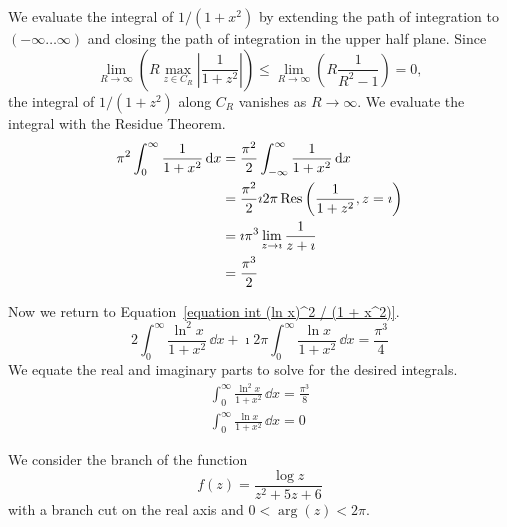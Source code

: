 {\begin{Solution}
  We evaluate the integral of $1/(1 + x^2)$ by extending the path of integration
  to $(-\infty \ldots \infty)$ and closing the path of integration in the upper half plane.
  Since 
  \[
  \lim_{R \to \infty} \left( R \max_{z \in C_R} \left| \frac{1}{1 + z^2} \right| \right)
  \leq \lim_{R \to \infty} \left( R \frac{1}{R^2 - 1} \right) = 0,
  \]
  the integral of $1 / (1 + z^2)$ along $C_R$ vanishes as $R \to \infty$.  We evaluate 
  the integral with the Residue Theorem.
  \begin{align*}
    \pi^2 \int_0^\infty \frac{1}{1 + x^2}\,\mathrm{d} x 
    &= \frac{\pi^2}{2} \int_{-\infty}^\infty \frac{1}{1 + x^2}\,\mathrm{d} x
    \\
    &= \frac{\pi^2}{2} \imath 2 \pi \mathop{\mathrm{Res}}\nolimits \left( \frac{1}{1 + z^2}, z = \imath \right) 
    \\
    &= \imath \pi^3 \lim_{z \to \imath} \frac{1}{z + \imath} 
    \\
    &= \frac{\pi^3}{2}
  \end{align*}

  Now we return to Equation~\ref{equation int (ln x)^2 / (1 + x^2)}.
  \[
  2 \int_0^\infty \frac{\ln^2 x}{1 + x^2}\,\dd x 
  + \imath 2 \pi \int_0^\infty \frac{\ln x}{1 + x^2} \,\dd x 
  = \frac{\pi^3}{4}
  \]
  We equate the real and imaginary parts to solve for the desired integrals.
  \begin{gather*}
    \boxed{
      \int_0^\infty \frac{\ln^2 x}{1 + x^2} \,\dd x = \frac{\pi^3}{8}
      } \\
    \boxed{
      \int_0^\infty \frac{\ln x}{1 + x^2} \,\dd x = 0
      }
  \end{gather*}
\end{Solution}















\begin{Solution}
  \label{solution 1/(x^2+5x+6)}
  We consider the branch of the function
  \[
  f(z) = \frac{ \log z }{ z^2 + 5 z + 6 }
  \]
  with a branch cut on the real axis and $0 < \arg(z) < 2 \pi$.


\end{Solution}}
